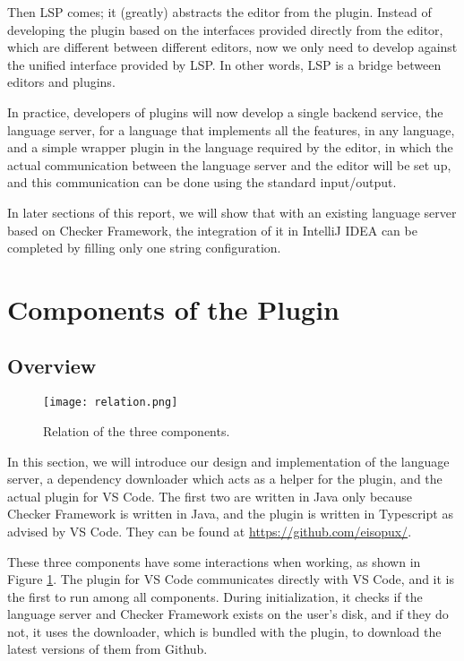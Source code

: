 \documentclass{article}
\begin{document}
Then LSP comes; it (greatly) abstracts the editor from the plugin. Instead of
developing the plugin based on the interfaces provided directly from the editor,
which are different between different editors, now we only need to develop
against the unified interface provided by LSP. In other words, LSP is a bridge
between editors and plugins.

In practice, developers of plugins will now develop a single backend service,
the language server, for a language that implements all the features, in any
language, and a simple wrapper plugin in the language required by the editor, in
which the actual communication between the language server and the editor will
be set up, and this communication can be done using the standard input/output.

In later sections of this report, we will show that with an existing language
server based on Checker Framework, the integration of it in IntelliJ IDEA can be
completed by filling only one string configuration.


\section{Components of the Plugin}

\subsection{Overview}

\begin{figure}
\centering
\texttt{[image: relation.png]}
\caption{Relation of the three components.}
\label{fig:components-relation}
\end{figure}

In this section, we will introduce our design and implementation of the language
server, a dependency downloader which acts as a helper for the plugin, and the
actual plugin for VS Code. The first two are written in Java only because
Checker Framework is written in Java, and the plugin is written in Typescript as
advised by VS Code. They can be found at \url{https://github.com/eisopux/}.

These three components have some interactions when working, as shown in Figure
\ref{fig:components-relation}. The plugin for VS Code communicates directly with
VS Code, and it is the first to run among all components. During initialization,
it checks if the language server and Checker Framework exists on the user's
disk, and if they do not, it uses the downloader, which is bundled with the
plugin, to download the latest versions of them from Github.
\end{document}
